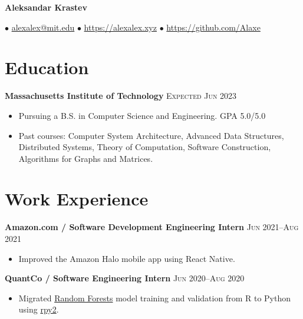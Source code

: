 \documentclass[letterpaper,11pt]{article}
\author{Aleksandar Krastev}
\date{2020-12-21}
\begin{document}
\setlength{\belowdisplayskip}{\parskip}
\setlength{\belowdisplayshortskip}{\belowdisplayskip}
\setlength{\abovedisplayskip}{\parskip}
\setlength{\abovedisplayshortskip}{\abovedisplayskip}



\centerline{{\Huge \bf Aleksandar Krastev}}
$\bullet$ \href{mailto:alexalex@mit.edu}{alexalex@mit.edu} \hfill
$\bullet$ \href{https://alexalex.xyz}{https://alexalex.xyz} \hfill
$\bullet$ \href{https://github.com/Alaxe}{https://github.com/Alaxe} \hfill

\section*{Education}
\textbf{Massachusetts Institute of Technology}
\hfill
\textsc{Expected Jun 2023}

\begin{itemize}
    \item Pursuing a B.S. in Computer Science and Engineering.
        \hfill GPA 5.0/5.0
    \item Past courses:
        Computer System Architecture,
        Advanced Data Structures,
        Distributed Systems,
        Theory of Computation,
        Software Construction,
        Algorithms for Graphs and Matrices.
\end{itemize}



\section*{Work Experience}
\textbf{Amazon.com / Software Development Engineering Intern}
\hfill
\textsc{Jun 2021--Aug 2021}
\begin{itemize}
    \item Improved the Amazon Halo mobile app using React Native.
\end{itemize}

\textbf{QuantCo / Software Engineering Intern}
\hfill
\textsc{Jun 2020--Aug 2020}
\begin{itemize}
    \item Migrated \href{https://grf-labs.github.io/}{Random Forests} model
        training and validation from R to Python using
        \href{https://rpy2.github.io/}{rpy2}.
\end{itemize}
\end{document}

